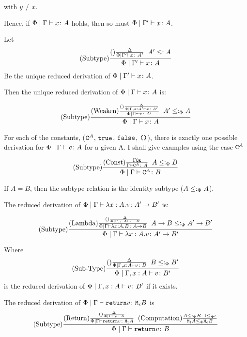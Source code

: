 {     with $y \neq x$.

    Hence, if $\Phi\mid\Gamma \vdash x \colon A$ holds, then so must $\Phi\mid\Gamma' \vdash x \colon A$.

    Let 
    \begin{equation}
        (\text{Subtype}) \frac{(\text{}) \frac{\Delta}{\Phi \mid \Gamma' \vdash x \colon A'}\;\; A' \leq: A}{\Phi \mid \Gamma' \vdash x \colon A}
    \end{equation}
    Be the  unique reduced derivation of $\Phi\mid\Gamma' \vdash x \colon A$.

    Then the unique reduced derivation of $\Phi\mid\Gamma \vdash x \colon A$ is:


    \begin{equation}
        (\text{Subtype}) \frac{
            (\text{Weaken}) \frac{
                (\text{}) \frac{\Delta}{\Phi\mid\Gamma, x: A' \vdash x \colon A'}
            }{\Phi\mid\Gamma \vdash x \colon A'}   
        \;\; A' \leq:_\Phi A
        }{\Phi\mid\Gamma \vdash x \colon A}
    \end{equation}

    For each of the constants, ($\texttt{C}^{A}$, $\texttt{true}$, $\texttt{false}$, $\texttt{()}$), there is exactly one possible derivation for $\Phi\mid\Gamma \vdash c \colon A$ for a given A. I shall give examples using the case $\texttt{C}^{A}$


    $$
        (\text{Subtype}) \frac{(\text{Const}) \frac{\Gamma \texttt{Ok}}{\Gamma \vdash \texttt{C}^{A} \colon A}\;\; A \leq:_\Phi B}{\Phi\mid\Gamma \vdash \texttt{C}^{A} \colon B}
    $$

    If $A = B$, then the subtype relation is the identity subtype ($A \leq:_\Phi A$).



    The reduced derivation of $\Phi\mid\Gamma \vdash \lambda x : A. v \colon A'\rightarrow B'$ is:


    $$
    (\text{Subtype}) \frac{(\text{Lambda}) \frac{(\text{}) \frac{\Delta}{\Phi\mid\Gamma, x: A \vdash v \colon B}}{
        \Phi\mid\Gamma \vdash \lambda x : A. B \colon A\rightarrow B}
        \;\;
        A\rightarrow B \leq:_\Phi A'\rightarrow B'
    }{
       \Phi\mid\Gamma \vdash \lambda x : A. v \colon A'\rightarrow B' 
    }
    $$

    Where 
    \begin{equation}
        (\text{Sub-Type}) \frac{(\text{}) \frac{\Delta}{\Phi\mid\Gamma, x: A \vdash v \colon B}\;\; B\leq:_\Phi B'}{\Phi\mid\Gamma, x: A \vdash v \colon B'}
    \end{equation}
    is the reduced derivation of $\Phi\mid\Gamma, x: A \vdash v \colon B'$ if it exists.

    The reduced derivation of $\Phi\mid\Gamma \vdash \texttt{return} v \colon \texttt{M}_{\epsilon}{B}$ is 
    $$
        (\text{Subtype}) \frac{
            (\text{Return}) \frac{(\text{}) \frac{\Delta}{\Phi\mid\Gamma \vdash v \colon A}}{\Phi\mid\Gamma \vdash \texttt{return} v \colon \texttt{M}_{\texttt{1}}{A}}
            \;\;
            (\text{Computation}) \frac{            
                A \leq:_\Phi B
            \;\;
            \texttt{1} \leq_{\Phi} \epsilon}{\texttt{M}_{\texttt{1}}{A}\leq_{\Phi}\texttt{M}_{\epsilon}{B}}
        }{\Phi\mid\Gamma \vdash \texttt{return} v \colon B}
    $$

}
